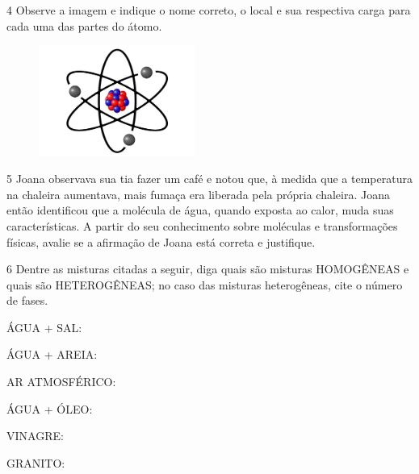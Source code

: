 \num{4}  Observe a imagem e indique o nome correto, o local e sua respectiva
  carga para cada uma das partes do átomo.

\begin{figure}[htpb!]
\includegraphics[width=2.02609in,height=1.43070in]{./imgs/img7.jpg}
\end{figure}


\num{5} Joana observava sua tia fazer um café e notou que, à medida que a temperatura na chaleira aumentava, mais fumaça era liberada pela própria chaleira. Joana então identificou que a molécula de água, quando exposta ao calor, muda suas características. A partir do seu conhecimento sobre moléculas e transformações físicas, avalie se a afirmação de Joana está correta e justifique.
  


\num{6} Dentre as misturas citadas a
  seguir, diga quais são misturas HOMOGÊNEAS e quais são HETEROGÊNEAS; no caso das
  misturas heterogêneas, cite o número de fases.

\begin{escolha}
\item
  ÁGUA + SAL: 
\item
  ÁGUA + AREIA: 
\item
  AR ATMOSFÉRICO: 
\item
  ÁGUA + ÓLEO: 
\item
  VINAGRE: 
\item
  GRANITO: 
\end{escolha}

